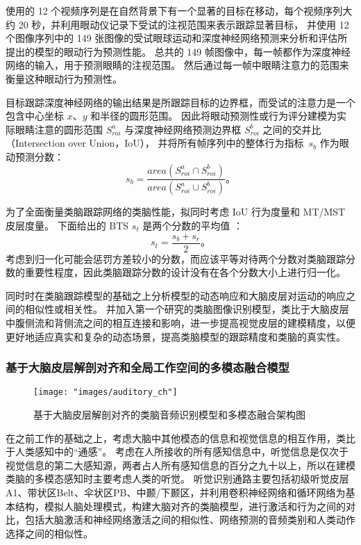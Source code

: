 \documentclass[a4paper,zihao=-4]{article}
\begin{document}
使用的 12 个视频序列是在自然背景下有一个显著的目标在移动，每个视频序列大约 20 秒，并利用眼动仪记录下受试的注视范围来表示跟踪显著目标，
并使用 12 个图像序列中的 149 张图像的受试眼球运动和深度神经网络预测来分析和评估所提出的模型的眼动行为预测性能。
总共的 149 帧图像中，每一帧都作为深度神经网络的输入，用于预测眼睛的注视范围。
然后通过每一帧中眼睛注意力的范围来衡量这种眼动行为预测性。

目标跟踪深度神经网络的输出结果是所跟踪目标的边界框，而受试的注意力是一个包含中心坐标 $x$、$y$ 和半径的圆形范围。
因此将眼动预测性或行为评分建模为实际眼睛注意的圆形范围 $S_{roi}^a$ 与深度神经网络预测边界框 $S_{roi}^b$ 之间的交并比（Intersection over Union，IoU），
并将所有帧序列中的整体行为指标~$s_b$ 作为眼动预测分数：
\begin{equation}
	s_b=\frac{area(S_{roi}^a \cap S_{roi}^b) }  { area(S_{roi}^a \cup S_{roi}^b) } \mbox{。}
\end{equation}


为了全面衡量类脑跟踪网络的类脑性能，拟同时考虑 IoU 行为度量和 MT/MST 皮层度量。
下面给出的 BTS $s_{t}$ 是两个分数的平均值 ：
\begin{equation} \label{equ:score_btn}
	s_{t} = \frac{s_b + s_r}{2}\mbox{。}
\end{equation}
考虑到归一化可能会惩罚方差较小的分数，而应该平等对待两个分数对类脑跟踪分数的重要性程度，因此类脑跟踪分数的设计没有在各个分数大小上进行归一化。


同时时在类脑跟踪模型的基础之上分析模型的动态响应和大脑皮层对运动的响应之间的相似性或相关性。
并加入第一个研究的类脑图像识别模型，类比于大脑皮层中腹侧流和背侧流之间的相互连接和影响，进一步提高视觉皮层的建模精度，以便更好地适应真实和复杂的动态场景，提高类脑模型的跟踪精度和类脑的真实性。






\subsubsection{基于大脑皮层解剖对齐和全局工作空间的多模态融合模型}
\begin{figure*}[htb!]
	\centering  
	{\texttt{[image: "images/auditory\_ch"]}
	}
	\caption{基于大脑皮层解剖对齐的类脑音频识别模型和多模态融合架构图}
	\label{fig:auditory}
\end{figure*}

在之前工作的基础之上，考虑大脑中其他模态的信息和视觉信息的相互作用，类比于人类感知中的“通感”。
考虑在人所接收的所有感知信息中，听觉信息是仅次于视觉信息的第二大感知源，两者占人所有感知信息的百分之九十以上，所以在建模类脑的多模态感知时主要考虑人类的听觉。
听觉识别通路主要包括初级听觉皮层A1、带状区Belt、伞状区PB、中颞/下颞区，并利用卷积神经网络和循环网络为基本结构，模拟人脑处理模式，构建大脑对齐的类脑模型，进行激活和行为之间的对比，包括大脑激活和神经网络激活之间的相似性、网络预测的音频类别和人类动作选择之间的相似性。
\end{document}
